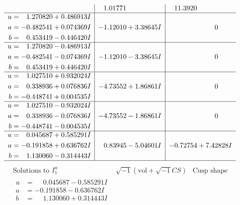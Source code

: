 \documentclass[1p]{elsarticle_modified}
\theoremstyle{definition}
\newcommand{\I}{\sqrt{-1}}
\begin{document}
$$\begin{array}{c|c|c}
 & \phantom{-}1.01771\phantom{ +0.000000I} & \phantom{-}11.3920\phantom{ +0.000000I} \\ \hline\begin{aligned}
u &= \phantom{-}1.270820 + 0.486913 I \\
a &= -0.482541 + 0.074369 I \\
b &= \phantom{-}0.453419 - 0.446420 I\end{aligned}
 & -1.12010 + 3.38645 I & \phantom{-0.000000 } 0 \\ \hline\begin{aligned}
u &= \phantom{-}1.270820 - 0.486913 I \\
a &= -0.482541 - 0.074369 I \\
b &= \phantom{-}0.453419 + 0.446420 I\end{aligned}
 & -1.12010 - 3.38645 I & \phantom{-0.000000 } 0 \\ \hline\begin{aligned}
u &= \phantom{-}1.027510 + 0.932024 I \\
a &= \phantom{-}0.338936 + 0.076836 I \\
b &= -0.448741 + 0.004535 I\end{aligned}
 & -4.73552 + 1.86861 I & \phantom{-0.000000 } 0 \\ \hline\begin{aligned}
u &= \phantom{-}1.027510 - 0.932024 I \\
a &= \phantom{-}0.338936 - 0.076836 I \\
b &= -0.448741 - 0.004535 I\end{aligned}
 & -4.73552 - 1.86861 I & \phantom{-0.000000 } 0 \\ \hline\begin{aligned}
u &= \phantom{-}0.045687 + 0.585291 I \\
a &= -0.191858 + 0.636762 I \\
b &= \phantom{-}1.130060 - 0.314443 I\end{aligned}
 & \phantom{-}0.83945 - 5.04601 I & -0.72754 + 7.42828 I\\
 \hline 
 \end{array}$$\newpage$$\begin{array}{c|c|c}  
\text{Solutions to }I^u_{1}& \I (\text{vol} + \sqrt{-1}CS) & \text{Cusp shape}\\
 \hline 
\begin{aligned}
u &= \phantom{-}0.045687 - 0.585291 I \\
a &= -0.191858 - 0.636762 I \\
b &= \phantom{-}1.130060 + 0.314443 I\end{aligned}

\end{array}$$
\end{document}
